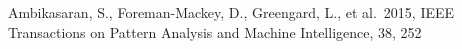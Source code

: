 \documentclass[twocolumn, twocolappendix]{aastex63}
\begin{document}
\clearpage





\begin{thebibliography}{}


















 Ambikasaran, S., Foreman-Mackey, D., Greengard, L., et al.\ 2015, IEEE Transactions on Pattern Analysis and Machine Intelligence, 38, 252











\end{thebibliography}
\end{document}
